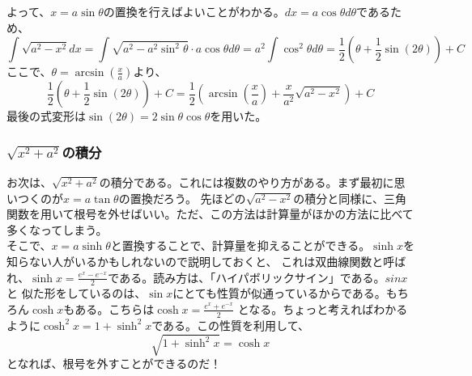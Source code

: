 \documentclass[a4j,dvipdfmx]{jsarticle}
\begin{document}
よって、$x=a\sin \theta$の置換を行えばよいことがわかる。$dx=a\cos \theta d\theta$であるため、
\begin{equation*}
    \int \sqrt{a^2-x^2}dx=\int \sqrt{a^2-a^2\sin^2\theta}\cdot a\cos\theta d\theta
    =a^2\int \cos^2\theta d\theta=\frac{1}{2}(\theta+\frac{1}{2}\sin(2\theta))+C
\end{equation*}
ここで、$\theta =\arcsin(\frac{x}{a})$より、
\begin{equation*}
    \frac{1}{2}(\theta+\frac{1}{2}\sin(2\theta))+C=\frac{1}{2}(\arcsin(\frac{x}{a})+\frac{x}{a^2}\sqrt{a^2-x^2})+C
\end{equation*}
最後の式変形は$\sin(2\theta)=2\sin\theta\cos\theta$を用いた。

\subsubsection{$\sqrt{x^2+a^2}$の積分}
お次は、$\sqrt{x^2+a^2}$の積分である。これには複数のやり方がある。まず最初に思いつくのが$x=a\tan \theta$の置換だろう。
先ほどの$\sqrt{a^2-x^2}$の積分と同様に、三角関数を用いて根号を外せばいい。ただ、この方法は計算量がほかの方法に比べて多くなってしまう。\\

そこで、$x=a\sinh \theta$と置換することで、計算量を抑えることができる。$\sinh x$を知らない人がいるかもしれないので説明しておくと、
これは双曲線関数と呼ばれ、$\displaystyle \sinh x=\frac{e^x-e^{-x}}{2}$である。読み方は、「ハイパボリックサイン」である。$sin x$と
似た形をしているのは、$\sin x$にとても性質が似通っているからである。もちろん$\cosh x$もある。こちらは$\displaystyle \cosh x=\frac{e^x+e^{-x}}{2}$
となる。ちょっと考えればわかるように$\cosh^2 x=1+\sinh^2 x$である。この性質を利用して、
\begin{equation*}
    \sqrt{1+\sinh^2 x}=\cosh x
\end{equation*}
となれば、根号を外すことができるのだ！\\
\end{document}

